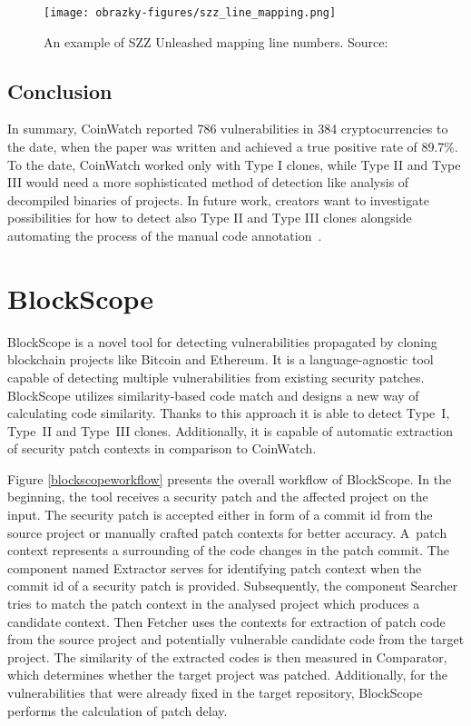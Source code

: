   \begin{figure}[h]
      \centering
      \texttt{[image: obrazky-figures/szz\_line\_mapping.png]}
      \caption{An example of SZZ Unleashed mapping line numbers. Source:~\cite{SZZunleashed}}
      \label{szz-line-map}
  \end{figure}

  \subsection*{Conclusion}
    In summary, CoinWatch reported 786 vulnerabilities in 384 cryptocurrencies to the date, when the paper
    was written and achieved a true positive rate of 89.7\%. To the date, CoinWatch worked only with Type I
    clones, while Type II and Type III would need a more sophisticated method of detection like analysis of
    decompiled binaries of projects. In future work, creators want to investigate possibilities for how to
    detect also Type II and Type III clones alongside automating the process of the manual code
    annotation~\cite{CoinWatch}.

  \section{BlockScope}
    BlockScope is a novel tool for detecting vulnerabilities propagated by cloning blockchain projects like
    Bitcoin and Ethereum. It is a language-agnostic tool capable of detecting multiple vulnerabilities from
    existing security patches. BlockScope utilizes similarity-based code match and designs
    a new way of calculating code similarity. Thanks to this approach it is able to detect Type~I, Type~II and
    Type~III clones. Additionally, it is capable of automatic extraction of security patch contexts in comparison
    to CoinWatch.

    Figure \ref{blockscopeworkflow} presents the overall workflow of BlockScope. In the beginning,
    the tool receives a security patch and the affected project on the input. The security patch is accepted
    either in form of a commit id from the source project or manually crafted patch contexts for better accuracy.
    A~patch context represents a surrounding of the code changes in the patch commit. The component named
    Extractor serves for identifying patch context when the commit id of a security patch is provided.
    Subsequently, the component Searcher tries to match the patch context in the analysed project which produces
    a candidate context. Then Fetcher uses the contexts for extraction of patch code from the source project
    and potentially vulnerable candidate code from the target project. The similarity of the extracted
    codes is then measured in Comparator, which determines whether the target project was patched. Additionally,
    for the vulnerabilities that were already fixed in the target repository, BlockScope performs
    the calculation of patch delay.

